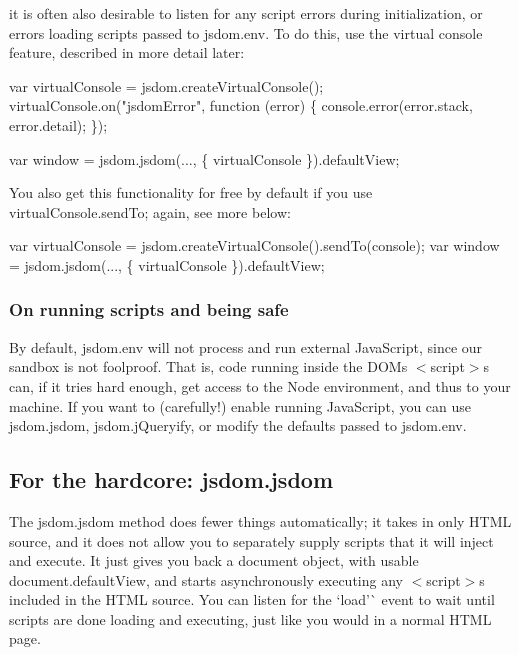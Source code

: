it is often also desirable to listen for any script errors during initialization, or errors loading scripts passed to {\ttfamily jsdom.\+env}. To do this, use the virtual console feature, described in more detail later\+:


\begin{DoxyCode}
var virtualConsole = jsdom.createVirtualConsole();
virtualConsole.on("jsdomError", function (error) \{
  console.error(error.stack, error.detail);
\});

var window = jsdom.jsdom(..., \{ virtualConsole \}).defaultView;
\end{DoxyCode}


You also get this functionality for free by default if you use {\ttfamily virtual\+Console.\+send\+To}; again, see more below\+:


\begin{DoxyCode}
var virtualConsole = jsdom.createVirtualConsole().sendTo(console);
var window = jsdom.jsdom(..., \{ virtualConsole \}).defaultView;
\end{DoxyCode}


\subsubsection*{On running scripts and being safe}

By default, {\ttfamily jsdom.\+env} will not process and run external Java\+Script, since our sandbox is not foolproof. That is, code running inside the D\+OM\textquotesingle{}s {\ttfamily $<$script$>$}s can, if it tries hard enough, get access to the Node environment, and thus to your machine. If you want to (carefully!) enable running Java\+Script, you can use {\ttfamily jsdom.\+jsdom}, {\ttfamily jsdom.\+j\+Queryify}, or modify the defaults passed to {\ttfamily jsdom.\+env}.

\subsection*{For the hardcore\+: {\ttfamily jsdom.\+jsdom}}

The {\ttfamily jsdom.\+jsdom} method does fewer things automatically; it takes in only H\+T\+ML source, and it does not allow you to separately supply scripts that it will inject and execute. It just gives you back a {\ttfamily document} object, with usable {\ttfamily document.\+default\+View}, and starts asynchronously executing any {\ttfamily $<$script$>$}s included in the H\+T\+ML source. You can listen for the `\textquotesingle{}load'\`{} event to wait until scripts are done loading and executing, just like you would in a normal H\+T\+ML page.


